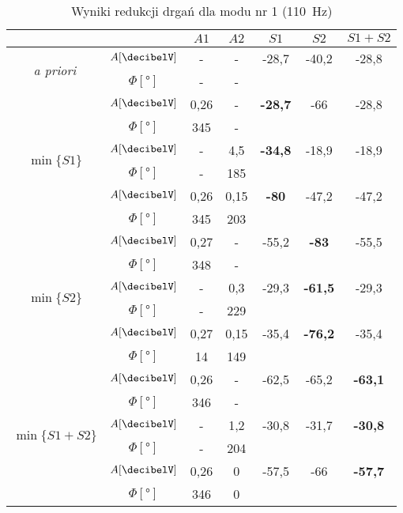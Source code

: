 \documentclass[polish,a4paper,11pt]{mwart}
\begin{document}
  \begin{table}[!tbh]
    \centering
    \caption{Wyniki redukcji drgań dla modu nr 1 (\SI{110}{\hertz})}
    \label{tab:red1}
    \begin{tabular}{|c|c|c|c|c|c|c|}
      \cline{3-7}
      \multicolumn{2}{c|}{}&$A1$&$A2$&$S1$&$S2$&$S1+S2$\\\hline
      \multirow{2}{*}{\textit{a priori}} &   $A [\si{\decibelV}]$ & - & - & -28,7 & -40,2 & -28,8\\\cline{2-7}
					 &$\Phi [\si{\degree}]$ & - & - & \multicolumn{3}{c}{}\\\hline
      \multirow{6}{*}{$\min\{S1\}$}      &   $A [\si{\decibelV}]$ & 0,26 & - & \textbf{-28,7} & -66 & -28,8\\\cline{2-7}
					 &$\Phi [\si{\degree}]$ & 345 & - & \multicolumn{3}{c}{}\\\cline{2-7}
					 &   $A [\si{\decibelV}]$ & - & 4,5 & \textbf{-34,8} & -18,9 & -18,9\\\cline{2-7}
					 &$\Phi [\si{\degree}]$ & - & 185 & \multicolumn{3}{c}{}\\\cline{2-7}
					 &   $A [\si{\decibelV}]$ & 0,26 & 0,15 & \textbf{-80} & -47,2 & -47,2\\\cline{2-7}
					 &$\Phi [\si{\degree}]$ & 345 & 203 & \multicolumn{3}{c}{}\\\hline
      \multirow{6}{*}{$\min\{S2\}$}      &   $A [\si{\decibelV}]$ & 0,27 & - & -55,2 & \textbf{-83} & -55,5\\\cline{2-7}
					 &$\Phi [\si{\degree}]$ & 348 & - & \multicolumn{3}{c}{}\\\cline{2-7}
					 &   $A [\si{\decibelV}]$ & - & 0,3 & -29,3 & \textbf{-61,5} & -29,3\\\cline{2-7}
					 &$\Phi [\si{\degree}]$ & - & 229 & \multicolumn{3}{c}{}\\\cline{2-7}
					 &   $A [\si{\decibelV}]$ & 0,27 & 0,15 & -35,4 & \textbf{-76,2} & -35,4\\\cline{2-7}
					 &$\Phi [\si{\degree}]$ & 14 & 149 & \multicolumn{3}{c}{}\\\hline
      \multirow{6}{*}{$\min\{S1+S2\}$}   &   $A [\si{\decibelV}]$ & 0,26 & - & -62,5 & -65,2 & \textbf{-63,1}\\\cline{2-7}
					 &$\Phi [\si{\degree}]$ & 346 & - & \multicolumn{3}{c}{}\\\cline{2-7}
					 &   $A [\si{\decibelV}]$ & - & 1,2 & -30,8 & -31,7 & \textbf{-30,8} \\\cline{2-7}
					 &$\Phi [\si{\degree}]$ & - & 204 & \multicolumn{3}{c}{}\\\cline{2-7}
					 &   $A [\si{\decibelV}]$ & 0,26 & 0 & -57,5 & -66 & \textbf{-57,7} \\\cline{2-7}
					 &$\Phi [\si{\degree}]$ & 346 & 0 & \multicolumn{3}{c}{}\\\cline{1-4}
    \end{tabular}
  \end{table}
\end{document}

